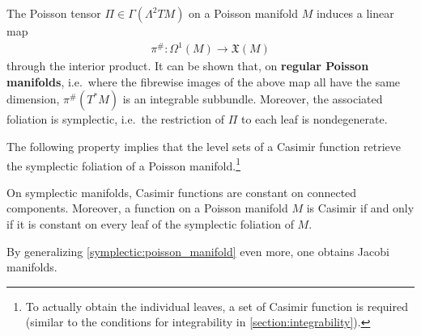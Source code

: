     \begin{property}
        The Poisson tensor $\Pi\in\Gamma(\Lambda^2TM)$ on a Poisson manifold $M$ induces a linear map
        \begin{gather}
            \pi^\#:\Omega^1(M)\rightarrow\mathfrak{X}(M)
        \end{gather}
        through the interior product. It can be shown that, on \textbf{regular Poisson manifolds}, i.e.~where the fibrewise images of the above map all have the same dimension, $\pi^\#(T^*M)$ is an integrable subbundle. Moreover, the associated foliation is symplectic, i.e.~the restriction of $\Pi$ to each leaf is nondegenerate.
    \end{property}


    The following property implies that the level sets of a Casimir function retrieve the symplectic foliation of a Poisson manifold.\footnote{To actually obtain the individual leaves, a set of Casimir function is required (similar to the conditions for integrability in \cref{section:integrability}).}
    \begin{property}
        On symplectic manifolds, Casimir functions are constant on connected components. Moreover, a function on a Poisson manifold $M$ is Casimir if and only if it is constant on every leaf of the symplectic foliation of $M$.
    \end{property}

    By generalizing \cref{symplectic:poisson_manifold} even more, one obtains Jacobi manifolds.

